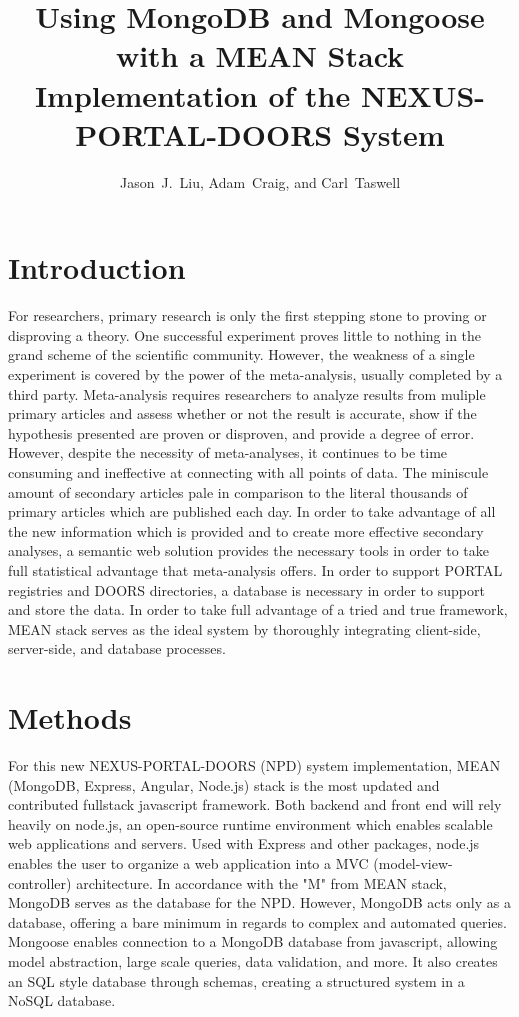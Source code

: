 \documentclass[10pt,twocolumn,twoside]{article}
\date{} %
\author{Jason~J.~Liu, Adam~Craig, and Carl~Taswell}
\title{Using MongoDB and Mongoose with a MEAN Stack Implementation of the NEXUS-PORTAL-DOORS System\\ }
\begin{document}
\maketitle
\thispagestyle{empty}

\section*{Introduction}
\label{secIntroduction}
	For researchers, primary research is only the first stepping stone to proving or disproving a theory. One successful experiment proves little to nothing in the grand scheme of the scientific community. However, the weakness of a single experiment is covered by the power of the meta-analysis, usually completed by a third party. Meta-analysis requires researchers to analyze results from muliple primary articles and assess whether or not the result is accurate, show if the hypothesis presented are proven or disproven, and provide a degree of error. However, despite the necessity of meta-analyses, it continues to be time consuming and ineffective at connecting with all points of data. The miniscule amount of secondary articles pale in comparison to the literal thousands of primary articles which are published each day. In order to take advantage of all the new information which is provided and to create more effective secondary analyses, a semantic web solution provides the necessary tools in order to take full statistical advantage that meta-analysis offers. 
 \newline
	In order to support PORTAL registries and DOORS directories, a database is necessary in order to support and store the data. In order to take full advantage of a tried and true framework, MEAN stack serves as the ideal system by thoroughly integrating client-side, server-side, and database processes. 

\section*{Methods}
\label{secMethods}
	For this new NEXUS-PORTAL-DOORS (NPD) system implementation, MEAN (MongoDB, Express, Angular, Node.js)  stack is the most updated and contributed fullstack javascript framework. Both backend and front end will rely heavily on node.js, an open-source runtime environment which enables scalable web applications and servers. Used with Express and other packages, node.js enables the user to organize a web application into a MVC (model-view-controller) architecture. In accordance with the "M" from MEAN stack, MongoDB serves as the database for the NPD. However, MongoDB acts only as a database, offering a bare minimum in regards to complex and automated queries. Mongoose enables connection to a MongoDB database from javascript, allowing model abstraction, large scale queries, data validation, and more. It also creates an SQL style database through schemas, creating a structured system in a NoSQL database. \newline
	
\end{document}
